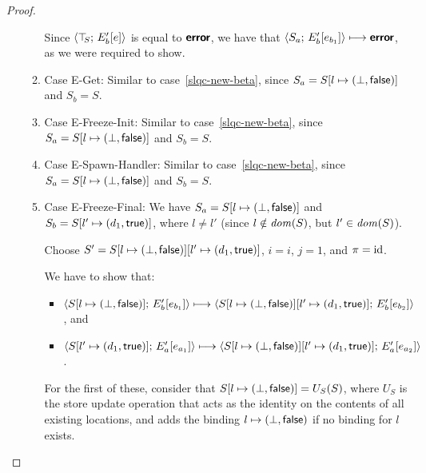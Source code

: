 \begin{proof}
\begin{enumerate}
\begin{enumerate}
      Since $\langle \top\hspace{-0.85mm}_{S};\, E'_b\hspace{-0.5mm}\left[e\right] \rangle$ is equal to $\textbf{\textsf{error}}$,
      we have that $\langle S_a;\, E'_b\hspace{-0.5mm}\left[e_{b_1}\right] \rangle \longmapsto
      \textbf{\textsf{error}}$, as we were required to show.

    \item \label{slqc-new-get}Case {\sc E-Get}: Similar to
      case~\ref{slqc-new-beta}, since $S_a =
      S[l \mapsto (\bot, \textsf{false})]$ and $S_b = S$.
    \item \label{slqc-new-freeze-init}Case {\sc E-Freeze-Init}:
      Similar to case~\ref{slqc-new-beta}, since $S_a =
      S[l \mapsto (\bot, \textsf{false})]$ and $S_b = S$.
    \item \label{slqc-new-spawn-handler}Case {\sc E-Spawn-Handler}:
      Similar to case~\ref{slqc-new-beta}, since $S_a =
      S[l \mapsto (\bot, \textsf{false})]$ and $S_b = S$.
    \item \label{slqc-new-freeze-final}Case {\sc E-Freeze-Final}: We
      have $S_a = S[l \mapsto (\bot, \textsf{false})]$ and $S_b =
      S[l' \mapsto (d_1, \textsf{true})]$, where $l \neq l'$ (since $l
      \notin \mathit{dom}(S)$, but $l' \in \mathit{dom}(S)$).

      Choose $S' =
      S[l \mapsto (\bot, \textsf{false})][l' \mapsto (d_1, \textsf{true})]$,
      $i = i$, $j = 1$, and $\pi = \mathrm{id}$.

      We have to show that:
      \begin{itemize}
      \item
        $\langle S[l \mapsto (\bot, \textsf{false})];\, E'_b\hspace{-0.5mm}\left[e_{b_1}\right] \rangle
        \longmapsto
        \langle S[l \mapsto (\bot, \textsf{false})][l' \mapsto (d_1, \textsf{true})];\, E'_b\hspace{-0.5mm}\left[e_{b_2}\right] \rangle$,
        and
      \item
        $\langle S[l' \mapsto (d_1, \textsf{true})];\, E'_a\hspace{-0.5mm}\left[e_{a_1}\right] \rangle
        \longmapsto
        \langle S[l \mapsto (\bot, \textsf{false})][l' \mapsto (d_1, \textsf{true})];\, E'_a\hspace{-0.5mm}\left[e_{a_2}\right] \rangle$.
      \end{itemize}

      For the first of these, consider that
      $S[l \mapsto (\bot, \textsf{false})] = U_S(S)$, where $U_S$ is the
      store update operation that acts as the identity on the contents
      of all existing locations, and adds the binding
      $l \mapsto (\bot, \textsf{false})$ if no binding for $l$
      exists.


\end{enumerate}
\end{enumerate}
\end{proof}
